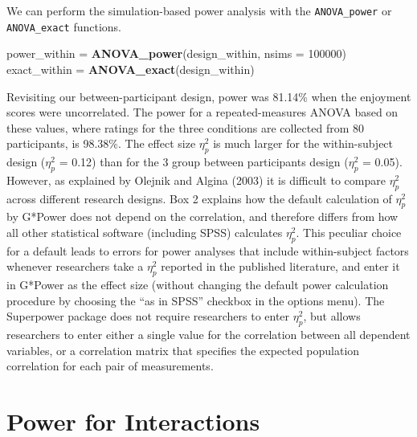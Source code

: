 \documentclass[
  ,jou,floatsintext]{apa6}
\newenvironment{Shaded}{\begin{snugshade}}{\end{snugshade}}
\newcommand{\DataTypeTok}[1]{\textcolor[rgb]{0.13,0.29,0.53}{#1}}
\newcommand{\DecValTok}[1]{\textcolor[rgb]{0.00,0.00,0.81}{#1}}
\newcommand{\KeywordTok}[1]{\textcolor[rgb]{0.13,0.29,0.53}{\textbf{#1}}}
\newcommand{\NormalTok}[1]{#1}
\newcommand{\StringTok}[1]{\textcolor[rgb]{0.31,0.60,0.02}{#1}}
\begin{document}
We can perform the simulation-based power analysis with the \texttt{ANOVA\_power} or \texttt{ANOVA\_exact} functions.

\begin{Shaded}
\begin{Highlighting}[]
\NormalTok{power_within =}\StringTok{ }\KeywordTok{ANOVA_power}\NormalTok{(design_within,}
                           \DataTypeTok{nsims =} \DecValTok{100000}\NormalTok{)}
\NormalTok{exact_within =}\StringTok{ }\KeywordTok{ANOVA_exact}\NormalTok{(design_within)}
\end{Highlighting}
\end{Shaded}

Revisiting our between-participant design, power was 81.14\% when the enjoyment scores were uncorrelated.
The power for a repeated-measures ANOVA based on these values, where ratings for the three conditions are collected from 80 participants, is 98.38\%.
The effect size \(\eta_p^2\) is much larger for the within-subject design (\(\eta_p^2\) = 0.12) than for the 3 group between participants design (\(\eta_p^2\) = 0.05).
However, as explained by Olejnik and Algina (2003) it is difficult to compare \(\eta_p^2\) across different research designs.
Box 2 explains how the default calculation of \(\eta_p^2\) by G*Power does not depend on the correlation, and therefore differs from how all other statistical software (including SPSS) calculates \(\eta_p^2\).
This peculiar choice for a default leads to errors for power analyses that include within-subject factors whenever researchers take a \(\eta_p^2\) reported in the published literature, and enter it in G*Power as the effect size (without changing the default power calculation procedure by choosing the \enquote{as in SPSS} checkbox in the options menu).
The Superpower package does not require researchers to enter \(\eta_p^2\), but allows researchers to enter either a single value for the correlation between all dependent variables, or a correlation matrix that specifies the expected population correlation for each pair of measurements.

\hypertarget{power-for-interactions}{%
\section{Power for Interactions}\label{power-for-interactions}}
\end{document}
